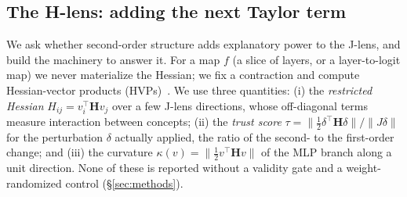 \documentclass[10pt]{article}
\newcommand{\Hess}{\mathbf{H}}
\newcommand{\secref}[1]{\S\ref{#1}}
\begin{document}
\subsection{The H-lens: adding the next Taylor term}
We ask whether second-order structure adds explanatory power to the J-lens, and build the machinery to answer it. For a map $f$ (a slice of layers, or a layer-to-logit map) we never materialize the Hessian; we fix a contraction and compute Hessian-vector products (HVPs)~\citep{pearlmutter1994fast}. We use three quantities: (i) the \emph{restricted Hessian} $H_{ij}=v_i^\top \Hess v_j$ over a few J-lens directions, whose off-diagonal terms measure interaction between concepts; (ii) the \emph{trust score} $\tau=\|\tfrac12\delta^\top\Hess\delta\|/\|J\delta\|$ for the perturbation $\delta$ actually applied, the ratio of the second- to the first-order change; and (iii) the curvature $\kappa(v)=\|\tfrac12 v^\top\Hess v\|$ of the MLP branch along a unit direction. None of these is reported without a validity gate and a weight-randomized control (\secref{sec:methods}).
\end{document}
